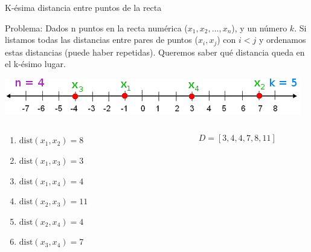 \documentclass[compress]{beamer}
\begin{document}
\begin{frame}{K-ésima distancia entre puntos de la recta}
	\begin{block}{Problema:}
		Dados n puntos en la recta numérica ($x_1, x_2, \dots, x_n$), y un número $k$. Si listamos todas las distancias entre pares de puntos ($x_i,x_j$) con $i < j$ y ordenamos estas distancias (puede haber repetidas). Queremos saber qué distancia queda en el k-ésimo lugar.
	\end{block}
	\begin{center}
		\includegraphics[scale=0.5]{recta.png}
	\end{center}
	\pause
  \vspace{-25pt}
	\begin{columns}[t]
        \begin{column}{.3\textwidth}
			{\footnotesize
			\begin{enumerate}
				\item	$\text{dist}(x_1,x_2) = 8$
				\item	$\text{dist}(x_1,x_3) = 3$
				\item	$\text{dist}(x_1,x_4) = 4$
				\item	$\text{dist}(x_2,x_3) = 11$
				\item	$\text{dist}(x_2,x_4) = 4$
				\item	$\text{dist}(x_3,x_4) = 7$
			\end{enumerate}
			}
        \end{column}
        \pause
        \begin{column}{.7\textwidth}
        {\Huge
            $$ D = [3,4,4,7,8,11] $$
        }
        \end{column}
    \end{columns}
\end{frame}
\end{document}
